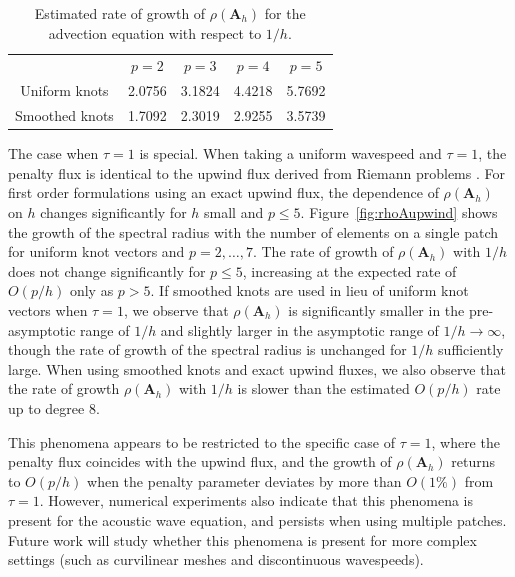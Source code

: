 \documentclass[preprint,10pt]{elsarticle}
\newcommand{\LRp}[1]{\left( #1 \right)}
\newcommand{\LRc}[1]{\left\{ #1 \right\}}
\newcommand{\avg}[1] {\ensuremath{\LRc{\!\{#1\}\!}}}
\newcommand{\reviewerOne}[1]{#1}
\begin{document}
\begin{table}[!h]
\centering
\begin{tabular}{|c||c|c|c|c|}
\hline
& $p = 2$ & $p = 3$ & $p=4$ & $p=5$\\
\hhline{|=|=|=|=|=|}
Uniform knots & 2.0756 &   3.1824 &   4.4218 &   5.7692\\
\hline
Smoothed knots & 1.7092  &  2.3019 &   2.9255 &   3.5739\\
\hline
\end{tabular}
\caption{Estimated rate of growth of $\rho\LRp{\bm{A}_h}$ for the advection equation with respect to $1/h$.}
\label{table:rhoA}
\end{table}

The case when $\tau = 1$ is special.  When taking a uniform wavespeed and $\tau = 1$, the penalty flux is identical to the upwind flux derived from Riemann problems \cite{hesthaven2007nodal}.  For first order formulations using an exact upwind flux, the dependence of $\rho\LRp{\bm{A}_h}$ on $h$ changes significantly for $h$ small and $p \leq 5$.  Figure~\ref{fig:rhoAupwind} shows the growth of the spectral radius with the number of elements on a single patch for uniform knot vectors and $p = 2, \ldots, 7$.  The rate of growth of $\rho\LRp{\bm{A}_h}$ with $1/h$ does not change significantly for $p \leq 5$, increasing at the expected rate of $O(p/h)$ only as $p > 5$.   %
If smoothed knots are used in lieu of uniform knot vectors when $\tau = 1$, we observe that $\rho\LRp{\bm{A}_h}$ is significantly smaller in the pre-asymptotic range of $1/h$ and slightly larger in the asymptotic range of $1/h \rightarrow \infty$, though the rate of growth of the spectral radius is unchanged for $1/h$ sufficiently large.  When using smoothed knots and exact upwind fluxes, we also observe that the rate of growth $\rho\LRp{\bm{A}_h}$ with $1/h$ is slower than the estimated $O(p/h)$ rate up to degree 8.  


This phenomena appears to be restricted to the specific case of \reviewerOne{$\tau=1$, where the penalty flux coincides with the upwind flux}, and the growth of $\rho\LRp{\bm{A}_h}$ returns to $O(p/h)$ when the penalty parameter deviates by more than $O(1\%)$ from $\tau = 1$.  \reviewerOne{However, numerical experiments also indicate that this phenomena is present for the acoustic wave equation, and persists when using multiple patches.  
Future work will study whether this phenomena is present for more complex settings (such as curvilinear meshes and discontinuous wavespeeds).}
\end{document}
